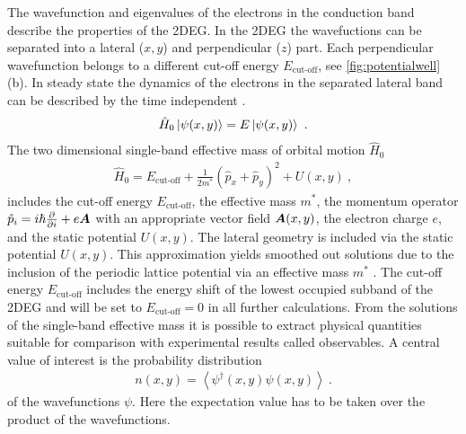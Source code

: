 The wavefunction and eigenvalues of the electrons in the conduction band describe the properties of the 2DEG. In the 2DEG the wavefuctions can be separated into a lateral ($x,y$) and perpendicular ($z$) part. Each perpendicular wavefunction belongs to a different cut-off energy $E_{\text{cut-off}}$, see \cref{fig:potentialwell}(b).
In steady state the dynamics of the electrons in the separated lateral band can be described by the time independent \sdg{}.
\begin{align}
 \hat{H}_0\left| \psi(x,y) \right> = E \left| \psi(x,y) \right>\ .
	\label{eqn:effectivemasssdg}
\end{align}
The two dimensional single-band effective mass \hamil{} of orbital motion $\hat{H}_0$
\begin{align}
\hat{H}_0 = E_{\text{cut-off}} + \frac{1}{2m^*}(\hat{p}_{x}+\hat{p}_{y})^2+U(x,y)\ ,
\end{align}
includes the cut-off energy $E_{\text{cut-off}}$, the effective mass $m^*$, the momentum operator $\hat{p}_i = i\hbar \frac{\partial }{\partial i} + e\boldsymbol{A}$ with an appropriate vector field $\boldsymbol{A}(x,y)$, the electron charge $e$, and the static potential $U(x,y)$.
The lateral geometry is included via the static potential $U(x,y)$.
This approximation yields smoothed out solutions due to the inclusion of the periodic lattice potential via an effective mass $m^*$ \cite{BastardBrum1986}.
The cut-off energy $E_{\text{cut-off}}$ includes the energy shift of the lowest occupied subband of the 2DEG and will be set to $E_{\text{cut-off}} = 0$ in all further calculations.
From the solutions of the single-band effective mass \sdg{} it is possible to extract physical quantities suitable for comparison with experimental results called observables.
A central value of interest is the probability distribution
\begin{align}
	n(x,y) = \left< \psi^{\dagger} (x,y) \psi(x,y)\right>\ .
	\label{eqn:analyticalelectrondensity}
\end{align}
of the wavefunctions $\psi$. Here the expectation value has to be taken over the product of the wavefunctions.\par
